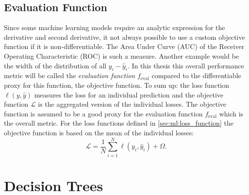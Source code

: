 \subsection{Evaluation Function}
Since some machine learning models require an analytic expression for the derivative and second derivative, it not always possible to use a custom objective function if it is non-differentiable. The Area Under Curve (AUC) of the Receiver Operating Characteristic (ROC) is such a measure. Another example would be the width of the distribution of all $y_i-\hat{y}_i$. In this thesis this overall performance metric will be called the \emph{evaluation function} $f_\mathrm{eval}$ compared to the differentiable proxy for this function, the objective function. To sum up: the loss function $\ell(y, \hat{y})$ measures the loss for an individual prediction and the objective function $\mathcal{L}$ is the aggregated version of the individual losses. The objective function is assumed to be a good proxy for the evaluation function $f_\mathrm{eval}$ which is the overall metric.  
For the loss functions defined in \autoref{sec:ml:loss_function} the objective function is based on the mean of the individual losses:
\begin{equation}
  \mathcal{L} = \frac{1}{N} \sum_{i=1}^N \ell(y_i, \hat{y}_i) + \Omega. 
\end{equation}

\section{Decision Trees}
\label{sec:ml:decision_trees}

